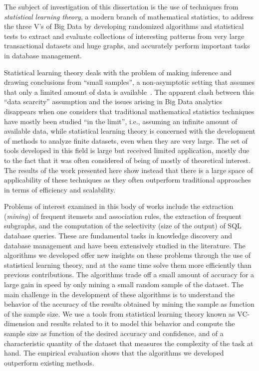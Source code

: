 The subject of investigation of this dissertation is the use of techniques from
\emph{statistical learning theory}, a modern branch of mathematical statistics,
to address the three V's of Big Data by developing randomized algorithms and
statistical tests to extract and evaluate collections of interesting patterns
from very large transactional datasets and huge graphs, and accurately perform
important tasks in database management. 

Statistical learning theory deals with the problem of making inference and
drawing conclusions from ``small samples'', a non-asymptotic setting that
assumes that only a limited amount of data is
available~\cite{Vapnik98,Vapnik99}. The apparent clash between this ``data
scarcity'' assumption and the issues arising in Big Data analytics disappears
when one considers that traditional mathematical statistics techniques have
mostly been studied ``in the limit'', i.e., assuming an infinite amount of
available data, while statistical learning theory is concerned with the
development of methods to analyze finite datasets, even when they are very
large. The set of tools developed in this field is large but received limited
application, mostly due to the fact that it was often considered of being of
mostly of theoretical interest. The results of the work presented here show
instead that there is a large space of applicability of these techniques as
they often outperform traditional approaches in terms of efficiency and
scalability.

Problems of interest examined in this body of works include the extraction
(\emph{mining}) of frequent itemsets and association rules, the extraction of
frequent subgraphs, and the computation of the selectivity (size of the output)
of SQL database queries. These are fundamental tasks in knowledge discovery and
database management and have been extensively studied in the literature. The
algorithms we developed offer new insights on these problems through the use of
statistical learning theory, and at the same time solve them more efficiently
than previous contributions. The algorithms trade off a small amount of accuracy
for a large gain in speed by only mining a small random sample of the dataset.
The main challenge in the development of these algorithms is to understand the
behavior of the accuracy of the results obtained by mining the sample as
function of the sample size. We use a tools from statistical learning theory
known as VC-dimension and results related to it to model this behavior and
compute the sample size as function of the desired accuracy and confidence, and
of a characteristic quantity of the dataset that measures the complexity of the
task at hand. The empirical evaluation shows that the algorithms we developed
outperform existing methods.

